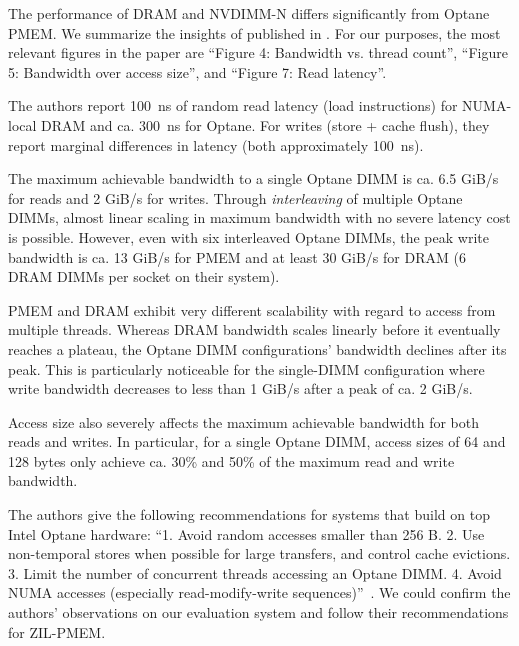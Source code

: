 \documentclass[12pt,a4paper,twoside]{book}
\begin{document}
The performance of DRAM and NVDIMM-N differs significantly from Optane PMEM.
We summarize the insights of \citeauthor{yangEmpiricalGuideBehavior2020} published in \cite{yangEmpiricalGuideBehavior2020}.
For our purposes, the most relevant figures in the paper are ``Figure 4: Bandwidth vs. thread count'', ``Figure 5: Bandwidth over access size'', and ``Figure 7: Read latency''.
\begin{description}[noitemsep]
    \item[Latency] The authors report 100~ns of random read latency (load instructions) for NUMA-local DRAM and ca. 300~ns for Optane.
        For writes (store + cache flush), they report marginal differences in latency (both approximately 100~ns).
    \item[Maximum Bandwidth] The maximum achievable bandwidth to a single Optane DIMM is ca. 6.5 GiB/s for reads and 2 GiB/s for writes.
        Through \textit{interleaving} of multiple Optane DIMMs, almost linear scaling in maximum bandwidth with no severe latency cost is possible.
        However, even with six interleaved Optane DIMMs, the peak write bandwidth is ca. 13 GiB/s for PMEM and at least 30 GiB/s for DRAM (6 DRAM DIMMs per socket on their system).
    \item[Scalability] PMEM and DRAM exhibit very different scalability with regard to access from multiple threads.
        Whereas DRAM bandwidth scales linearly before it eventually reaches a plateau, the Optane DIMM configurations' bandwidth declines after its peak.
        This is particularly noticeable for the single-DIMM configuration where write bandwidth decreases to less than 1 GiB/s after a peak of ca. 2 GiB/s.
    \item[Access Granularity] Access size also severely affects the maximum achievable bandwidth for both reads and writes.
        In particular, for a single Optane DIMM, access sizes of 64 and 128 bytes only achieve ca. 30\% and 50\% of the maximum read and write bandwidth.
\end{description}
The authors give the following recommendations for systems that build on top Intel Optane hardware:
``1. Avoid random accesses smaller than 256 B.
2. Use non-temporal stores when possible for large transfers, and control cache evictions.
3. Limit the number of concurrent threads accessing an Optane DIMM.
4. Avoid NUMA accesses (especially read-modify-write sequences)''~\cite{yangEmpiricalGuideBehavior2020}.
We could confirm the authors' observations on our evaluation system and follow their recommendations for ZIL-PMEM.
\end{document}
